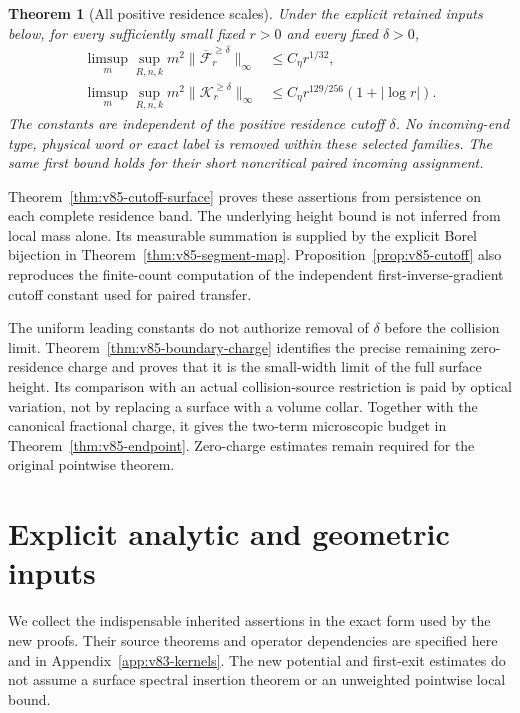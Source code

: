\documentclass[11pt,reqno]{amsart}
\numberwithin{equation}{section}
\newtheorem{theorem}{Theorem}[section]
\theoremstyle{definition}\newtheorem{definition}[theorem]{Definition}
\theoremstyle{remark}\newtheorem{remark}[theorem]{Remark}
\theoremstyle{definition}\newtheorem{inputstatement}[theorem]{Input statement}
\begin{document}
\begin{theorem}[All positive residence scales]
\label{thm:v85-main}
Under the explicit retained inputs below, for every sufficiently small
fixed $r>0$ and every fixed $\delta>0$,
\begin{align}
 \limsup_m\sup_{R,n,k}m^2
       \|\overline{\mathcal F}_r^{\ge\delta}\|_\infty
                 &\le C_\eta r^{1/32},\label{eq:v85-main-surface}\\
 \limsup_m\sup_{R,n,k}m^2\|\mathcal K_r^{\ge\delta}\|_\infty
                 &\le C_\eta r^{129/256}(1+|\log r|).
                                               \label{eq:v85-main-critical}
\end{align}
The constants are independent of the positive residence cutoff
$\delta$. No incoming-end type, physical word or exact label is removed
within these selected families. The same first bound holds for their
short noncritical paired incoming assignment.
\end{theorem}
Theorem~\ref{thm:v85-cutoff-surface} proves these assertions from
persistence on each complete residence band. The underlying height
bound is not inferred from local mass alone. Its measurable summation
is supplied by the explicit Borel bijection in
Theorem~\ref{thm:v85-segment-map}. Proposition~\ref{prop:v85-cutoff}
also reproduces the finite-count computation of the independent
first-inverse-gradient cutoff constant used for paired transfer.

The uniform leading constants do not authorize removal of $\delta$
before the collision limit. Theorem~\ref{thm:v85-boundary-charge}
identifies the precise remaining zero-residence charge and proves that
it is the small-width limit of the full surface height. Its comparison
with an actual collision-source restriction is paid by optical
variation, not by replacing a surface with a volume collar. Together
with the canonical fractional charge, it gives the two-term
microscopic budget in Theorem~\ref{thm:v85-endpoint}. Zero-charge
estimates remain required for the original pointwise theorem.

\section{Explicit analytic and geometric inputs}
We collect the indispensable inherited assertions in the exact form
used by the new proofs. Their source theorems and operator dependencies
are specified here and in Appendix~\ref{app:v83-kernels}. The new
potential and first-exit estimates do not assume a surface spectral
insertion theorem or an unweighted pointwise local bound.
\end{document}

